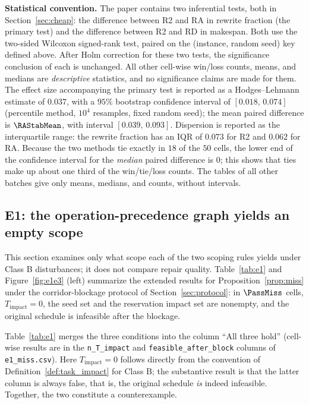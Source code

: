 \textbf{Statistical convention.}
The paper contains two inferential tests, both in Section~\ref{sec:cheap}: the difference between R2 and RA in rewrite fraction (the primary test)
and the difference between R2 and RD in makespan. Both use the two-sided Wilcoxon signed-rank test, paired on the (instance, random seed) key defined above.
After Holm correction for these two tests, the significance conclusion of each is unchanged. All other cell-wise win/loss counts, means, and medians
are \emph{descriptive} statistics, and no significance claims are made for them.
The effect size accompanying the primary test is reported as a Hodges--Lehmann estimate of \(0.037\), with a \(95\%\) bootstrap confidence interval of
\([0.018,\,0.074]\) (percentile method, \(10^4\) resamples, fixed random seed); the mean paired difference is
\(\RAStabMean\), with interval \([0.039,\,0.093]\). Dispersion is reported as the interquartile range: the rewrite fraction has an IQR of
\(0.073\) for R2 and \(0.062\) for RA.
Because the two methods tie exactly in \(18\) of the \(50\) cells, the lower end of the confidence interval for the \emph{median} paired difference is \(0\);
this shows that ties make up about one third of the win/tie/loss counts.
The tables of all other batches give only means, medians, and counts, without intervals.

\subsection{E1: the operation-precedence graph yields an empty scope}
\label{sec:e1}

This section examines only what scope each of the two scoping rules yields under Class B disturbances; it does not compare repair quality.
Table~\ref{tab:e1} and Figure~\ref{fig:e1e3} (left) summarize the extended results for Proposition~\ref{prop:miss} under the corridor-blockage protocol of Section~\ref{sec:protocol}:
in \(\PassMiss\) cells, \(T_{\mathrm{impact}}=0\), the seed set and the reservation impact set are nonempty, and the original schedule is infeasible after the blockage.

Table~\ref{tab:e1} merges the three conditions into the column ``All three hold'' (cell-wise results are in the
\texttt{n\_T\_impact} and \texttt{feasible\_after\_block} columns of \texttt{e1\_miss.csv}).
Here \(T_{\mathrm{impact}}=0\) follows directly from the convention of Definition~\ref{def:task_impact} for Class B;
the substantive result is that the latter column is always false, that is, the original schedule \emph{is} indeed infeasible. Together, the two constitute a counterexample.

